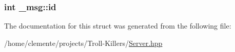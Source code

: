 \subsubsection[{id}]{\setlength{\rightskip}{0pt plus 5cm}int \+\_\+msg\+::id}\label{struct__msg_a5319cda008478b61e06ddf06c2cf166e}


The documentation for this struct was generated from the following file\+:\begin{DoxyCompactItemize}
\item 
/home/clemente/projects/\+Troll-\/\+Killers/\hyperlink{_server_8hpp}{Server.\+hpp}\end{DoxyCompactItemize}

